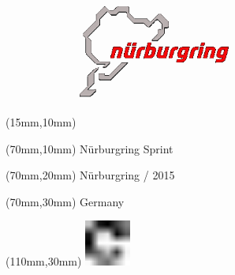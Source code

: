 \null\newpage
\begin{textblock*}{50mm}(15mm,10mm)%
\includegraphics[width=50mm]{LG/NUR.png}
\end{textblock*}
\begin{textblock*}{130mm}(70mm,10mm)%
{\fontsize{20}{20}\selectfont Nürburgring Sprint}\\
\end{textblock*}
\begin{textblock*}{120mm}(70mm,20mm)%
{\fontsize{16}{16}\selectfont Nürburgring / 2015}\\
\end{textblock*}
\begin{textblock*}{120mm}(70mm,30mm)%
{\fontsize{12}{12}\selectfont Germany}
\end{textblock*}
\begin{textblock*}{30mm}(110mm,30mm)%
\centering
\includegraphics[height=15mm]{icons/fa-rotate-right.pdf}
\end{textblock*}
